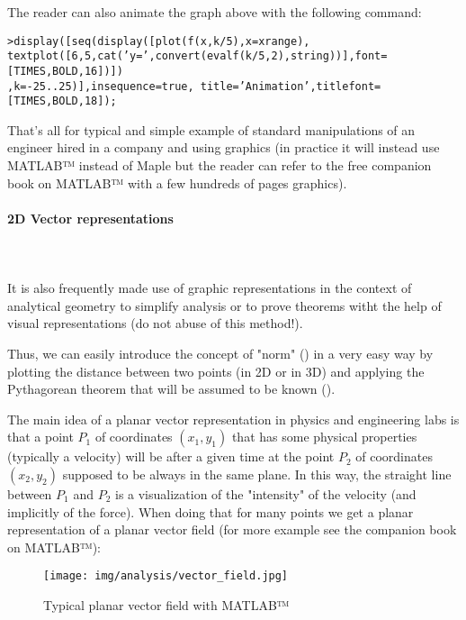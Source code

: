 The reader can also animate the graph above with the following command:

\texttt{>display([seq(display([plot(f(x,k/5),x=xrange),}\\ \texttt{textplot([6,5,cat('y=',convert(evalf(k/5,2),string))],font=[TIMES,BOLD,16])])}\\
\texttt{,k=-25..25)],insequence=true, title='Animation',titlefont=[TIMES,BOLD,18]);}

That's all for typical and simple example of standard manipulations of an engineer hired in a company and using graphics (in practice it will instead use MATLAB™ instead of Maple but the reader can refer to the free companion book on MATLAB™ with a few hundreds of pages graphics).

\paragraph{2D Vector representations}\mbox{}\\\\
It is also frequently made use of graphic representations in the context of analytical geometry to simplify analysis or to prove theorems witht the help of visual representations (do not abuse of this method!).

Thus, we can easily introduce the concept of "norm" () in a very easy way by plotting the distance between two points (in 2D or in 3D) and applying the Pythagorean theorem that will be assumed to be known ().

The main idea of a planar vector representation in physics and engineering labs is that  a point $P_1$ of coordinates $(x_1,y_1)$ that has some physical properties (typically a velocity) will be after a given time at the point $P_2$ of coordinates $(x_2,y_2)$ supposed to be always in the same plane. In this way, the straight line between $P_1$ and $P_2$ is a visualization of the "intensity" of the velocity (and implicitly of the force). When doing that for many points we get a planar representation of a planar vector field (for more example see the companion book on MATLAB™):

\begin{figure}[H]
\centering
\texttt{[image: img/analysis/vector\_field.jpg]}
\caption[]{Typical planar vector field with MATLAB™}
\end{figure}


